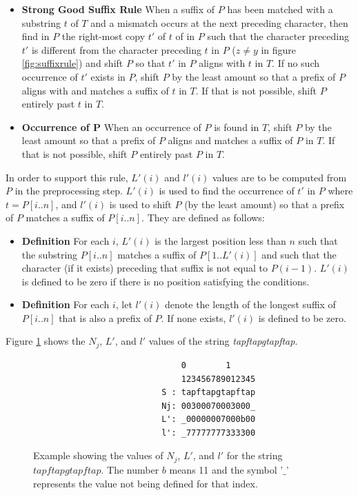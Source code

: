 \begin{itemize}
    \item[] \textbf{Strong Good Suffix Rule} When a suffix of $P$ has been matched with a substring $t$ of $T$ and a mismatch occurs at the next preceding character, then find in $P$ the right-most copy $t'$ of $t$ of in $P$ such that the character preceding $t'$ is different from the character preceding $t$ in $P$ ($z\neq y$ in figure \ref{fig:suffixrule}) and shift $P$ so that $t'$ in $P$ aligns with $t$ in $T$. If no such occurrence of $t'$ exists in $P$, shift $P$ by the least amount so that a prefix of $P$ aligns with and matches a suffix of $t$ in $T$. If that is not possible, shift $P$ entirely past $t$ in $T$. 
    \item[] \textbf{Occurrence of P} When an occurrence of $P$ is found in $T$, shift $P$ by the least amount so that a prefix of $P$ aligns and matches a suffix of $P$ in $T$. If that is not possible, shift $P$ entirely past $P$ in $T$. 
\end{itemize}

In order to support this rule, $L'(i)$ and $l'(i)$ values are to be computed from $P$ in the preprocessing step. $L'(i)$ is used to find the occurrence of $t'$ in $P$ where $t=P[i..n]$, and $l'(i)$ is used to shift $P$ (by the least amount) so that a prefix of $P$ matches a suffix of $P[i..n]$. They are defined as follows:

\begin{itemize}
    \item[] \textbf{Definition} For each $i$, $L'(i)$ is the largest position less than $n$ such that the substring $P[i..n]$ matches a suffix of $P[1..L'(i)]$ and such that the character (if it exists) preceding that suffix is not equal to $P(i-1)$. $L'(i)$ is defined to be zero if there is no position satisfying the conditions. 
    \item[] \textbf{Definition} For each $i$, let $l'(i)$ denote the length of the longest suffix of $P[i..n]$ that is also a prefix of $P$. If none exists, $l'(i)$ is defined to be zero. 
\end{itemize}

Figure \ref{fig:gsr-example} shows the $N_j$, $L'$, and $l'$ values of the string \textit{tapftapgtapftap}.
\begin{figure}[ht!]
\begin{verbatim}
                              0        1      
                              123456789012345 
                          S : tapftapgtapftap 
                          Nj: 00300070003000_ 
                          L': _00000007000b00 
                          l': _77777777333300 
\end{verbatim}
\caption{Example showing the values of $N_j$, $L'$, and $l'$ for the string $tapftapgtapftap$. The number $b$ means 11 and the symbol '$\_$' represents the value not being defined for that index. }
\label{fig:gsr-example}
\end{figure}

